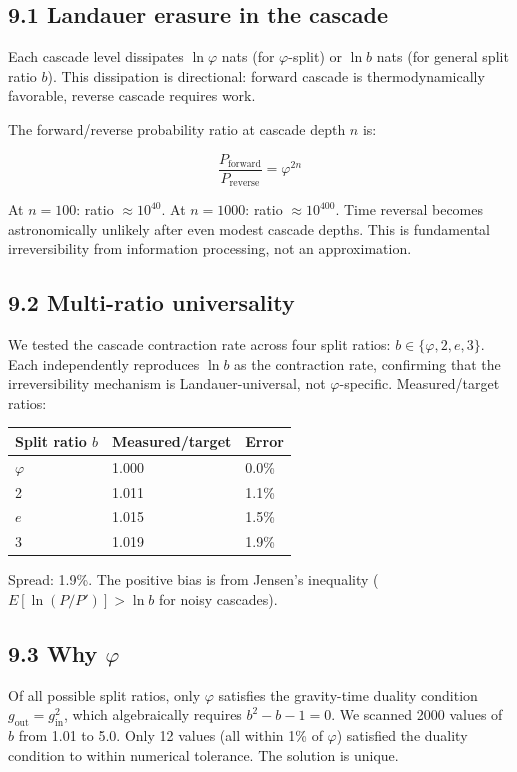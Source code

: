 \documentclass[11pt,a4paper]{article}
\begin{document}
\subsection*{9.1 Landauer erasure in the cascade}

Each cascade level dissipates $\ln\varphi$ nats (for $\varphi$-split) or $\ln b$ nats (for general split ratio $b$). This dissipation is directional: forward cascade is thermodynamically favorable, reverse cascade requires work.

The forward/reverse probability ratio at cascade depth $n$ is:

\[\frac{P_{\text{forward}}}{P_{\text{reverse}}} = \varphi^{2n}\]

At $n = 100$: ratio $\approx 10^{40}$. At $n = 1000$: ratio $\approx 10^{400}$. Time reversal becomes astronomically unlikely after even modest cascade depths. This is fundamental irreversibility from information processing, not an approximation.

\subsection*{9.2 Multi-ratio universality}

We tested the cascade contraction rate across four split ratios: $b \in \{\varphi, 2, e, 3\}$. Each independently reproduces $\ln b$ as the contraction rate, confirming that the irreversibility mechanism is Landauer-universal, not $\varphi$-specific. Measured/target ratios:

\begin{longtable}[]{@{}lll@{}}
\toprule
Split ratio $b$ & Measured/target & Error \\
\midrule\endhead
$\varphi$ & 1.000 & 0.0\% \\
2 & 1.011 & 1.1\% \\
$e$ & 1.015 & 1.5\% \\
3 & 1.019 & 1.9\% \\
\bottomrule
\end{longtable}

Spread: 1.9\%. The positive bias is from Jensen's inequality ($E[\ln(P/P')] > \ln b$ for noisy cascades).

\subsection*{9.3 Why $\varphi$}

Of all possible split ratios, only $\varphi$ satisfies the gravity-time duality condition $g_{\text{out}} = g_{\text{in}}^2$, which algebraically requires $b^2 - b - 1 = 0$. We scanned 2000 values of $b$ from 1.01 to 5.0. Only 12 values (all within 1\% of $\varphi$) satisfied the duality condition to within numerical tolerance. The solution is unique.
\end{document}
